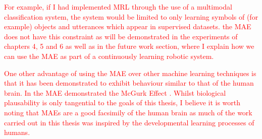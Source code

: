 \textcolor{red}{For example, if I had implemented \ac{MRL} through the use of a multimodal classification system, the system would be limited to only learning symbols of (for example) objects and utterances which appear in supervised datasets. the \ac{MAE} does not have this constraint as will be demonstrated in the experiments of chapters 4, 5 and 6 as well as in the future work section, where I explain how we can use the \ac{MAE} as part of a continuously learning robotic system.}

\textcolor{red}{One other advantage of using the \ac{MAE} over other machine learning techniques is that it has been demonstrated to exhibit behaviour similar to that of the human brain. In \cite{ngiam2011multimodal} the \ac{MAE} demonstrated the McGurk Effect \cite{mcgurk1976hearing}. Whilst biological plausability is only tangential to the goals of this thesis, I believe it is worth noting that \acp{MAE} are a good facsimily of the human brain as much of the work carried out in this thesis was inspired by the developmental learning processes of humans.}

%
%
%

